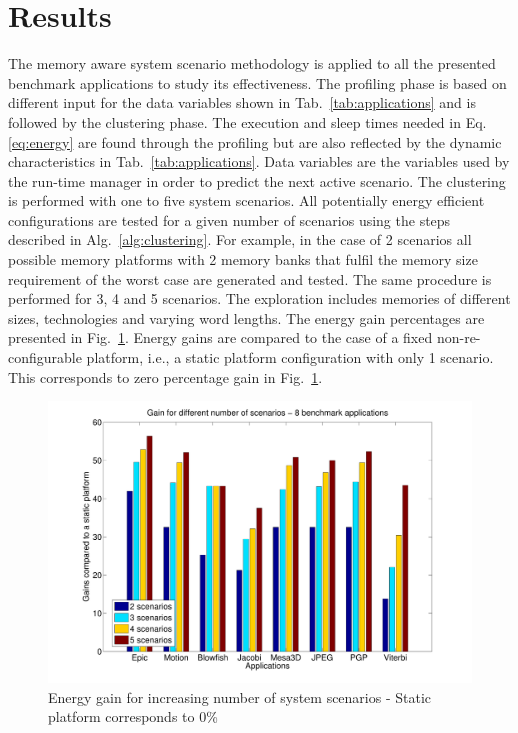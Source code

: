 \section{Results}

The memory aware system scenario methodology is applied to all the presented benchmark applications to study its effectiveness. The profiling phase is based on different input for the data variables shown in Tab.~\ref{tab:applications} and is followed by the clustering phase. The execution and sleep times needed in Eq.\ref{eq:energy} are found through the profiling but are also reflected by the dynamic characteristics in Tab.~\ref{tab:applications}. Data variables are the variables used by the run-time manager in order to predict the next active scenario. The clustering is performed with one to five system scenarios. All potentially energy efficient configurations are tested for a given number of scenarios using the steps described in Alg.~\ref{alg:clustering}. For example, in the case of 2 scenarios all possible memory platforms with 2 memory banks that fulfil the memory size requirement of the worst case are generated and tested. The same procedure is performed for 3, 4 and 5 scenarios. The exploration includes memories of different sizes, technologies and varying word lengths. The energy gain percentages are presented in Fig.~\ref{fig:gains}. Energy gains are compared to the case of a fixed non-re-configurable platform, i.e., a static platform configuration with only 1 scenario. This corresponds to zero percentage gain in Fig.~\ref{fig:gains}. 

\begin{figure}[!t]
\centering
\includegraphics[width=\textwidth]{B/Images/6appsGains.pdf}
\caption{Energy gain for increasing number of system scenarios - Static platform corresponds to 0\%}
\label{fig:gains}
\end{figure}

